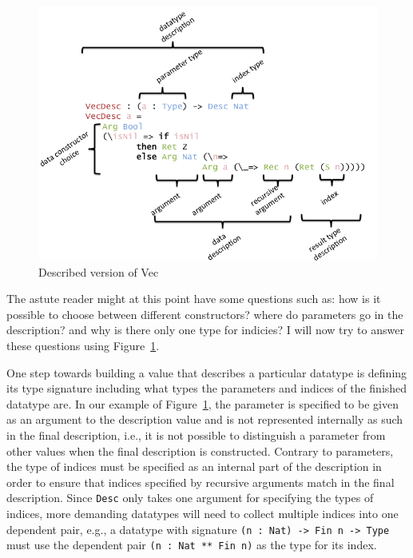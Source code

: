 \documentclass{ituthesis}
\begin{document}
\begin{figure}[ht]
\begin{center}
    \includegraphics[scale=0.5]{Figures/VectorDescription.png}
\end{center}
\caption{Described version of Vec}
\label{fig:descvec}
\end{figure}

The astute reader might at this point have some questions such as: how is it possible to choose between different constructors? where do parameters go in the description? and why is there only one type for indicies?
I will now try to answer these questions using Figure~\ref{fig:descvec}.

One step towards building a value that describes a particular datatype is defining its type signature
including what types the parameters and indices of the finished datatype are. In our example of Figure~\ref{fig:descvec},
the parameter is specified to be given as an argument to the description value and is not represented internally as such in the final description, i.e., it is not possible to distinguish a parameter from other values when the final description is constructed.
Contrary to parameters, the type of indices must be specified as an internal part of the description in order to ensure that indices specified by recursive arguments match in the final description.
Since \texttt{Desc} only takes one argument for specifying the types of indices, more demanding datatypes will need to collect multiple indices into one dependent pair, e.g.,
a datatype with signature \texttt{(n : Nat) -> Fin n -> Type} must use the dependent pair \texttt{(n : Nat ** Fin n)} as the type for its index.
\end{document}
